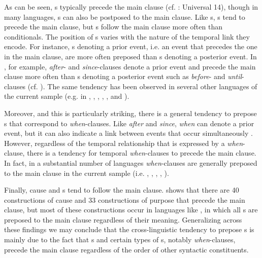 \documentclass[output=paper]{langsci/langscibook}
\begin{document}
As can be seen, s typically precede the main clause (cf. \citealt{Greenberg1963}: Universal 14), though in many languages, s can also be postposed to the main clause. Like s, s tend to precede the main clause, but s follow the main clause more often than conditionals. The position of s varies with the nature of the temporal link they encode. For instance, s denoting a prior event, i.e. an event that precedes the one in the main clause, are more often preposed than s denoting a posterior event. In , for example, \textit{after}- and \textit{since}-clauses denote a prior event and precede the main clause more often than s denoting a posterior event such as \textit{before}- and \textit{until}-clauses (cf. \citealt{Diessel2008}). The same tendency has been observed in several other languages of the current sample (e.g. in , , , , , and ). 

Moreover, and this is particularly striking, there is a general tendency to prepose s that correspond to  \textit{when}-clauses. Like \textit{after} and \textit{since}, \textit{when} can denote a prior event, but it can also indicate a link between events that occur simultaneously \citep{Diessel2008}. However, regardless of the temporal relationship that is expressed by a \textit{when}-clause, there is a tendency for temporal \textit{when}-clauses to precede the main clause. In fact, in a substantial number of languages \textit{when}-clauses are generally preposed to the main clause in the current sample (i.e. , , , , ). 

Finally, cause and s tend to follow the main clause.  shows that there are 40  constructions of cause and 33  constructions of purpose that precede the main clause, but most of these constructions occur in languages like , in which all s are preposed to the main clause regardless of their meaning. Generalizing across these findings we may conclude that the cross-linguistic tendency to prepose s is mainly due to the fact that s and certain types of s, notably \textit{when}-clauses, precede the main clause regardless of the order of other syntactic constituents.
\end{document}
